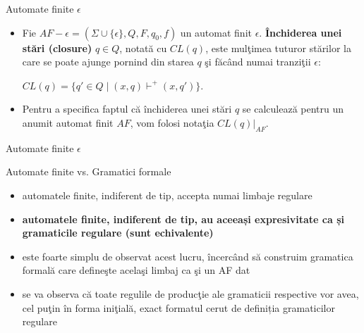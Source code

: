 \documentclass[pdf]{beamer}
\begin{document}
\begin{frame}{Automate finite $\epsilon$}
\begin{itemize}
\item
Fie $AF-\epsilon=(\Sigma \cup \{ \epsilon \}, Q, F, q_{0}, f)$ un automat finit $ \epsilon $. \textbf{Închiderea unei stări (closure)} $q \in Q$, notată cu $CL(q)$, este mulţimea tuturor stărilor la care se poate ajunge pornind din starea $ q $ şi făcând numai tranziţii $\epsilon$:

$CL(q) = \{ q' \in Q \; | \; (x, q) \vdash^+ (x, q') \}$.
\item
Pentru a specifica faptul că închiderea unei stări $ q $ se calculează pentru un anumit automat finit $ AF $, vom folosi notaţia $ CL(q)|_{AF} $.
\end{itemize}
\end{frame}



\begin{frame}{Automate finite $\epsilon$}
\begin{figure}[H]
\centering
{}
\end{figure}
\end{frame}



\begin{frame}{Automate finite vs. Gramatici formale}
\begin{itemize}
\item
automatele finite, indiferent de tip, accepta numai limbaje regulare
\item
\textbf{automatele finite, indiferent de tip, au aceeași expresivitate ca și gramaticile regulare (sunt echivalente)}
\item
este foarte simplu de observat acest lucru, încercând să construim gramatica formală care defineşte acelaşi limbaj ca şi un AF dat
\item
se va observa că toate regulile de producţie ale gramaticii respective vor avea, cel puţin în forma iniţială, exact formatul cerut de definiția gramaticilor regulare
\end{itemize}
\end{frame}
\end{document}
